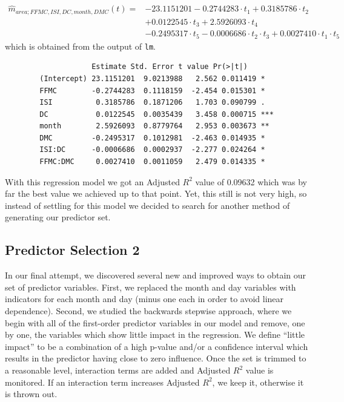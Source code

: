 \documentclass{article}
\begin{document}
\begin{align*}
  \widehat{m}_{area;FFMC,ISI,DC,month,DMC}(t) = &-23.1151201 - 0.2744283 \cdot t_1 + 0.3185786 \cdot t_2 \\
  &+ 0.0122545 \cdot t_3 + 2.5926093 \cdot t_4 \\
  &- 0.2495317 \cdot t_5 - 0.0006686 \cdot t_2 \cdot t_3 + 0.0027410 \cdot t_1 \cdot t_5 	   
\end{align*}
which is obtained from the output of \verb=lm=.

\begin{verbatim}
              		Estimate Std. Error t value Pr(>|t|)    
		(Intercept) 23.1151201  9.0213988   2.562 0.011419 *  
		FFMC        -0.2744283  0.1118159  -2.454 0.015301 *  
		ISI          0.3185786  0.1871206   1.703 0.090799 .  
		DC           0.0122545  0.0035439   3.458 0.000715 ***
		month        2.5926093  0.8779764   2.953 0.003673 ** 
		DMC         -0.2495317  0.1012981  -2.463 0.014935 *  
		ISI:DC      -0.0006686  0.0002937  -2.277 0.024264 *  
		FFMC:DMC     0.0027410  0.0011059   2.479 0.014335 *
\end{verbatim}

With this regression model we got an Adjusted $R^{2}$ value of 0.09632 which
was by far the best value we achieved up to that point. Yet, this still is not
very high, so instead of settling for this model we decided to search for
another method of generating our predictor set.

\subsection{Predictor Selection 2}

In our final attempt, we discovered several new and improved ways to obtain our
set of predictor variables. First, we replaced the month and day variables with
indicators for each month and day (minus one each in order to avoid linear
dependence). Second, we studied the backwards stepwise approach, where we begin
with all of the first-order predictor variables in our model and remove, one by
one, the variables which show little impact in the regression. We define
``little impact'' to be a combination of a high p-value and/or a confidence
interval which results in the predictor having close to zero influence. Once
the set is trimmed to a reasonable level, interaction terms are added and
Adjusted $R^2$ value is monitored. If an interaction term increases Adjusted
$R^2$, we keep it, otherwise it is thrown out. 
\end{document}
